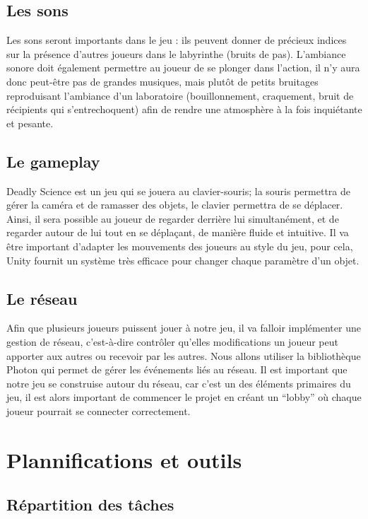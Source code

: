\documentclass{article}
\begin{document}
\subsection{Les sons}
Les sons seront importants dans le jeu : ils peuvent donner de précieux indices sur la présence d’autres joueurs dans le labyrinthe (bruits de pas). L’ambiance sonore doit également permettre au joueur de se plonger dans l’action, il n’y aura donc peut-être pas de grandes musiques, mais plutôt de petits bruitages reproduisant l’ambiance d’un laboratoire (bouillonnement, craquement, bruit de récipients qui s’entrechoquent) afin de rendre une atmosphère à la fois inquiétante et pesante.

\subsection{Le gameplay}
Deadly Science est un jeu qui se jouera au clavier-souris; la souris permettra de gérer la caméra et de ramasser des objets, le clavier permettra de se déplacer. Ainsi, il sera possible au joueur de regarder derrière lui simultanément, et de regarder autour de lui tout en se déplaçant, de manière fluide et intuitive. Il va être important d’adapter les mouvements des joueurs au style du jeu, pour cela, Unity fournit un système très efficace pour changer chaque paramètre d’un objet.

\subsection{Le réseau}
Afin que plusieurs joueurs puissent jouer à notre jeu, il va falloir implémenter une gestion de réseau, c’est-à-dire contrôler qu’elles modifications un joueur peut apporter aux autres ou recevoir par les autres. Nous allons utiliser la bibliothèque Photon qui permet de gérer les événements liés au réseau. Il est important que notre jeu se construise autour du réseau, car c’est un des éléments primaires du jeu, il est alors important de commencer le projet en créant un “lobby” où chaque joueur pourrait se connecter correctement.


\newpage
\section{Plannifications et outils}
\subsection{Répartition des tâches}
\end{document}
